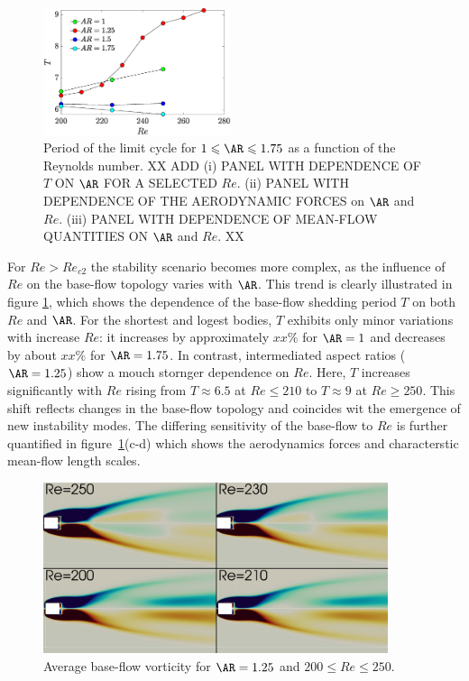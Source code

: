 \begin{figure}
  \centering
  \includegraphics[width=0.49\textwidth]{./fig/AR1s/T_Re.eps}
  \caption{Period of the limit cycle for $1 \le \AR \le 1.75$ as a function of the Reynolds number. XX ADD (i) PANEL WITH DEPENDENCE OF $T$ ON $\AR$ FOR A SELECTED $Re$. (ii) PANEL WITH DEPENDENCE OF THE AERODYNAMIC FORCES on $\AR$ and $Re$. (iii) PANEL WITH DEPENDENCE OF MEAN-FLOW QUANTITIES ON $\AR$ and $Re$. XX}
  \label{fig:T_Re_small}
\end{figure}
%
For $Re>Re_{c2}$ the stability scenario becomes more complex, as the influence of $Re$ on the base-flow topology varies with $\AR$. This trend is clearly illustrated in figure \ref{fig:T_Re_small}, which shows the dependence of the base-flow shedding period $T$ on both $Re$ and $\AR$. For the shortest and logest bodies, $T$ exhibits only minor variations with increase $Re$: it increases by approximately $xx\%$ for $\AR =1$ and decreases by about $xx\%$ for $\AR=1.75$. In contrast, intermediated aspect ratios ($\AR=1.25$) show a mouch stornger dependence on $Re$. Here, $T$ increases significantly with $Re$ rising from $T \approx 6.5$ at $Re \le 210$ to $T \approx 9$ at $Re \ge 250$. This shift reflects changes in the base-flow topology and coincides wit the emergence of new instability modes. The differing sensitivity of the base-flow to $Re$ is further quantified in figure~\ref{fig:T_Re_small}(c-d) which shows the aerodynamics forces and characterstic mean-flow length scales.

\begin{figure}
  \centering
  \includegraphics[width=0.9\textwidth]{./fig/AR1p25/Av_BF_Re200_Re250.png}
  \caption{Average base-flow vorticity for $\AR=1.25$ and $200 \le Re \le 250$.}
  \label{fig:av_bf}
\end{figure}

